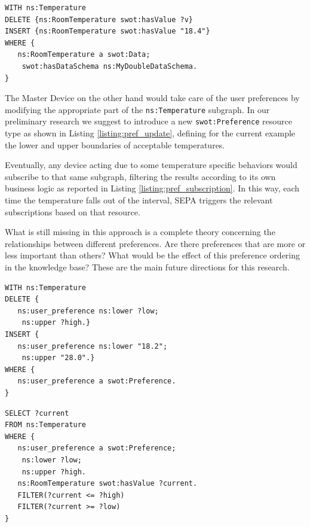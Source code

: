 \begin{lstlisting}[caption={SPARQL Update temperature subgraph. Refer to the previous Sections for any unexplained resource. Notice that this is currently (October 2019) an ongoing work and therefore it is not to be considered a final solution.}, label=listing:temp_update_subgraph]
WITH ns:Temperature
DELETE {ns:RoomTemperature swot:hasValue ?v}
INSERT {ns:RoomTemperature swot:hasValue "18.4"}
WHERE {
   ns:RoomTemperature a swot:Data;
   	swot:hasDataSchema ns:MyDoubleDataSchema.
}
\end{lstlisting}

The Master Device on the other hand would take care of the user preferences by modifying the appropriate part of the \texttt{ns:Temperature} subgraph. In our preliminary research we suggest to introduce a new \texttt{swot:Preference} resource type as shown in Listing \ref{listing:pref_update}, defining for the current example the lower and upper boundaries of acceptable temperatures.

Eventually, any device acting due to some temperature specific behaviors would subscribe to that same subgraph, filtering the results according to its own business logic as reported in Listing \ref{listing:pref_subscription}. In this way, each time the temperature falls out of the interval, SEPA triggers the relevant subscriptions based on that resource.

What is still missing in this approach is a complete theory concerning the relationships between different preferences. Are there preferences that are more or less important than others? What would be the effect of this preference ordering in the knowledge base? These are the main future directions for this research.\\
\begin{minipage}{\linewidth}
\begin{lstlisting}[caption={SPARQL Update to temperature preferences. Notice that this is currently (October 2019) an ongoing work and therefore it is not to be considered a final solution.}, label=listing:pref_update]
WITH ns:Temperature
DELETE {
   ns:user_preference ns:lower ?low;
    ns:upper ?high.}
INSERT {
   ns:user_preference ns:lower "18.2";
    ns:upper "28.0".}
WHERE {
   ns:user_preference a swot:Preference.
}
\end{lstlisting}
\end{minipage}
\begin{lstlisting}[caption={Suggested example for SPARQL device FILTER subscription. Notice that this is currently (October 2019) an ongoing work and therefore it is not to be considered a final solution.}, label=listing:pref_subscription]
SELECT ?current
FROM ns:Temperature
WHERE {
   ns:user_preference a swot:Preference;
    ns:lower ?low;
    ns:upper ?high.
   ns:RoomTemperature swot:hasValue ?current.
   FILTER(?current <= ?high)
   FILTER(?current >= ?low)	
}
\end{lstlisting}

